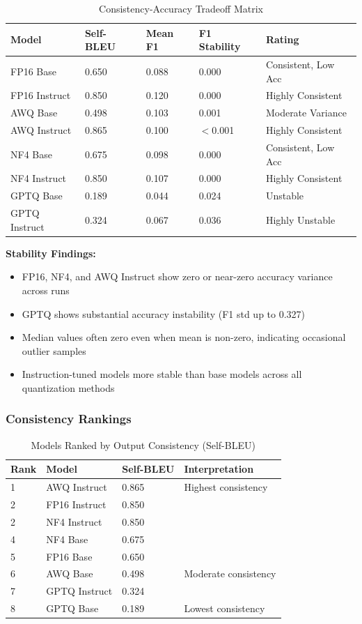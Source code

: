 \documentclass[11pt,a4paper]{article}
\begin{document}
\begin{table}[H]
\centering
\caption{Consistency-Accuracy Tradeoff Matrix}
\small
\begin{tabularx}{\textwidth}{@{}X C{1.8cm} C{1.8cm} C{1.8cm} C{2.2cm}@{}}
\toprule
\textbf{Model} & \textbf{Self-BLEU} & \textbf{Mean F1} & \textbf{F1 Stability} & \textbf{Rating} \\
\midrule
FP16 Base & 0.650 & 0.088 & 0.000 & Consistent, Low Acc \\
FP16 Instruct & 0.850 & 0.120 & 0.000 & Highly Consistent \\
AWQ Base & 0.498 & 0.103 & 0.001 & Moderate Variance \\
AWQ Instruct & 0.865 & 0.100 & $<$0.001 & Highly Consistent \\
NF4 Base & 0.675 & 0.098 & 0.000 & Consistent, Low Acc \\
NF4 Instruct & 0.850 & 0.107 & 0.000 & Highly Consistent \\
GPTQ Base & 0.189 & 0.044 & 0.024 & Unstable \\
GPTQ Instruct & 0.324 & 0.067 & 0.036 & Highly Unstable \\
\bottomrule
\end{tabularx}
\end{table}

\textbf{Stability Findings:}
\begin{itemize}
\item FP16, NF4, and AWQ Instruct show zero or near-zero accuracy variance across runs
\item GPTQ shows substantial accuracy instability (F1 std up to 0.327)
\item Median values often zero even when mean is non-zero, indicating occasional outlier samples
\item Instruction-tuned models more stable than base models across all quantization methods
\end{itemize}

\subsubsection{Consistency Rankings}

\begin{table}[H]
\centering
\caption{Models Ranked by Output Consistency (Self-BLEU)}
\begin{tabularx}{\textwidth}{@{}l l C{2.5cm} X@{}}
\toprule
\textbf{Rank} & \textbf{Model} & \textbf{Self-BLEU} & \textbf{Interpretation} \\
 & AWQ Instruct & 0.865 & Highest consistency \\
2 & FP16 Instruct & 0.850 & \\
2 & NF4 Instruct & 0.850 & \\
4 & NF4 Base & 0.675 & \\
5 & FP16 Base & 0.650 & \\
6 & AWQ Base & 0.498 & Moderate consistency \\
7 & GPTQ Instruct & 0.324 & \\
8 & GPTQ Base & 0.189 & Lowest consistency \\
\bottomrule
\end{tabularx}
\end{table}
\end{document}
